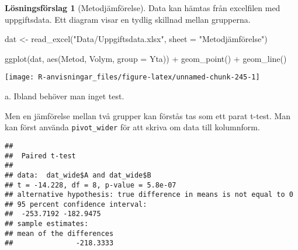 \documentclass[
]{book}
\newenvironment{Shaded}{\begin{snugshade}}{\end{snugshade}}
\newcommand{\AttributeTok}[1]{\textcolor[rgb]{0.77,0.63,0.00}{#1}}
\newcommand{\FunctionTok}[1]{\textcolor[rgb]{0.00,0.00,0.00}{#1}}
\newcommand{\NormalTok}[1]{#1}
\newcommand{\OtherTok}[1]{\textcolor[rgb]{0.56,0.35,0.01}{#1}}
\newcommand{\SpecialCharTok}[1]{\textcolor[rgb]{0.00,0.00,0.00}{#1}}
\newcommand{\StringTok}[1]{\textcolor[rgb]{0.31,0.60,0.02}{#1}}
\theoremstyle{definition}
\theoremstyle{definition}
\theoremstyle{definition}
\theoremstyle{definition}
\newtheorem{hypothesis}{Lösningsförslag}[chapter]
\theoremstyle{remark}
\begin{document}
\begin{hypothesis}[Metodjämförelse]
Data kan hämtas från excelfilen med uppgiftsdata. Ett diagram visar en tydlig skillnad mellan grupperna.

\begin{Shaded}
\begin{Highlighting}[]
\NormalTok{dat }\OtherTok{\textless{}{-}} \FunctionTok{read\_excel}\NormalTok{(}\StringTok{"Data/Uppgiftsdata.xlsx"}\NormalTok{, }\AttributeTok{sheet =} \StringTok{"Metodjämförelse"}\NormalTok{)}

\FunctionTok{ggplot}\NormalTok{(dat, }\FunctionTok{aes}\NormalTok{(Metod, Volym, }\AttributeTok{group =}\NormalTok{ Yta)) }\SpecialCharTok{+}
  \FunctionTok{geom\_point}\NormalTok{() }\SpecialCharTok{+}
  \FunctionTok{geom\_line}\NormalTok{()}
\end{Highlighting}
\end{Shaded}

\begin{center}\texttt{[image: R-anvisningar\_files/figure-latex/unnamed-chunk-245-1]} \end{center}

a. Ibland behöver man inget test.

Men en jämförelse mellan två grupper kan förstås tas som ett parat t-test. Man kan först använda \texttt{pivot\_wider} för att skriva om data till kolumnform.

\begin{Shaded}
\end{Shaded}

\begin{verbatim}
## 
##  Paired t-test
## 
## data:  dat_wide$A and dat_wide$B
## t = -14.228, df = 8, p-value = 5.8e-07
## alternative hypothesis: true difference in means is not equal to 0
## 95 percent confidence interval:
##  -253.7192 -182.9475
## sample estimates:
## mean of the differences 
##               -218.3333
\end{verbatim}


\end{hypothesis}
\end{document}
